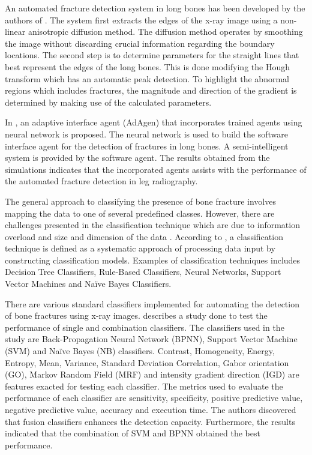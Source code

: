 \documentclass[11pt,twocolumn]{witseiepaper}
\begin{document}
	An automated fracture detection system in long bones has been developed by the authors of \cite{Donnelley2005}. The system first extracts the edges of the x-ray image using a non-linear anisotropic diffusion method. The diffusion method operates by smoothing the image without discarding crucial information regarding the boundary locations. The second step is to determine parameters for the straight lines that best represent the edges of the long bones. This is done modifying the Hough transform which has an automatic peak detection. To highlight the abnormal regions which includes fractures, the magnitude and direction of the gradient is determined by making use of the calculated parameters.
	
	In \cite{Syiam_Aziem_Soliman2004}, an adaptive interface agent (AdAgen) that incorporates trained agents using neural network is proposed. The neural network is used to build the software interface agent for the detection of fractures in long bones. A semi-intelligent system is provided by the software agent. The results obtained from the simulations indicates that the incorporated agents assists with the performance of the automated fracture detection in leg radiography.
	
	The general approach to classifying the presence of bone fracture involves mapping the data to one of several predefined classes. However, there are challenges presented 
	in the classification technique which are due to information overload and size and dimension of the data \cite{Mahendran2011}. According to \cite{Mahendran2011}, a classification technique is defined as a systematic approach of processing data input by constructing classification models. Examples of classification techniques includes Decision Tree Classifiers, Rule-Based Classifiers, Neural Networks, Support Vector Machines and Na\"{i}ve Bayes Classifiers.
	
	There are various standard classifiers implemented for automating the detection of bone fractures using x-ray images. \cite{Mahendran2012} describes a study done to test the performance of single and combination classifiers. The classifiers used in the study are Back-Propagation Neural Network (BPNN), Support Vector Machine (SVM) and Na\"{i}ve Bayes (NB) classifiers. Contrast, Homogeneity, Energy, Entropy, Mean, Variance, Standard Deviation Correlation, Gabor orientation (GO), Markov Random Field (MRF) and intensity gradient direction (IGD) are features exacted for testing each classifier. The metrics used to evaluate the performance of each classifier are sensitivity, specificity, positive predictive value, negative predictive value, accuracy and execution time. The authors discovered that fusion classifiers enhances the detection capacity. Furthermore, the results indicated that the combination of SVM and BPNN obtained the best performance.
	
\end{document}
